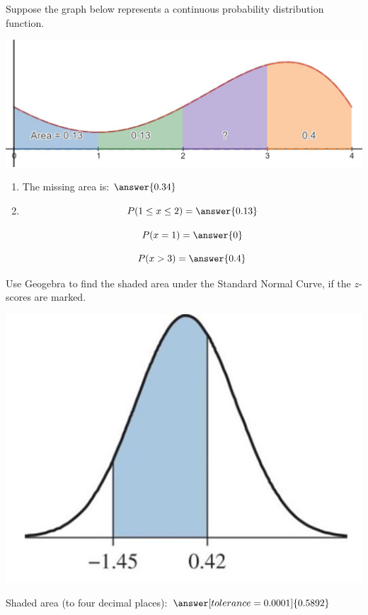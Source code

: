 \documentclass{ximera}
\begin{document}
\begin{problem}\label{prob:exam2prob2}
Suppose the graph below represents a continuous probability distribution function.
\begin{image}
\includegraphics{test2pic3.JPG}
\end{image}
  \begin{enumerate}
      \item The missing area is: $\answer{0.34}$
      \item 
      
          $$P(1\leq x\leq 2)=\answer{0.13}$$
  
          $$P(x=1)=\answer{0}$$
   
          $$P(x>3)=\answer{0.4}$$
    
     
  \end{enumerate}
\end{problem}

\begin{problem}\label{prob:exam2prob3}
Use Geogebra to find the shaded area under the Standard Normal Curve, if the $z$-scores are marked. \begin{image}
\includegraphics{test2pic2.JPG}
\end{image}

Shaded area (to four decimal places): $\answer[tolerance=0.0001]{0.5892}$
\end{problem}
\end{document}
